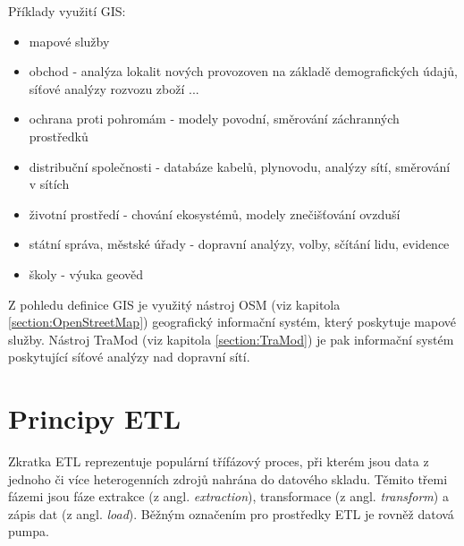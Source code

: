 Příklady využití GIS: 
\begin{itemize}
  \item mapové služby
  \item obchod - analýza lokalit nových provozoven na základě demografických údajů, síťové analýzy rozvozu zboží ...
  \item ochrana proti pohromám - modely povodní, směrování záchranných prostředků
  \item distribuční společnosti - databáze kabelů, plynovodu, analýzy sítí, směrování v sítích
  \item životní prostředí - chování ekosystémů, modely znečišťování ovzduší
  \item státní správa, městské úřady - dopravní analýzy, volby, sčítání lidu, evidence
  \item školy - výuka geověd
\end{itemize}

Z pohledu definice GIS je využitý nástroj OSM (viz kapitola \ref{section:OpenStreetMap}) geografický informační systém, který poskytuje mapové služby. Nástroj TraMod (viz kapitola \ref{section:TraMod}) je pak informační systém poskytující síťové analýzy nad dopravní sítí.

\chapter{Principy ETL}
\label{chapter:principy_etl}

Zkratka ETL reprezentuje populární třífázový proces, při kterém jsou data z jednoho či více heterogenních zdrojů nahrána do datového skladu. Těmito třemi fázemi jsou fáze extrakce (z angl. \textit{extraction}), transformace (z angl. \textit{transform}) a zápis dat (z angl. \textit{load}). Běžným označením pro prostředky ETL je rovněž datová pumpa. 


